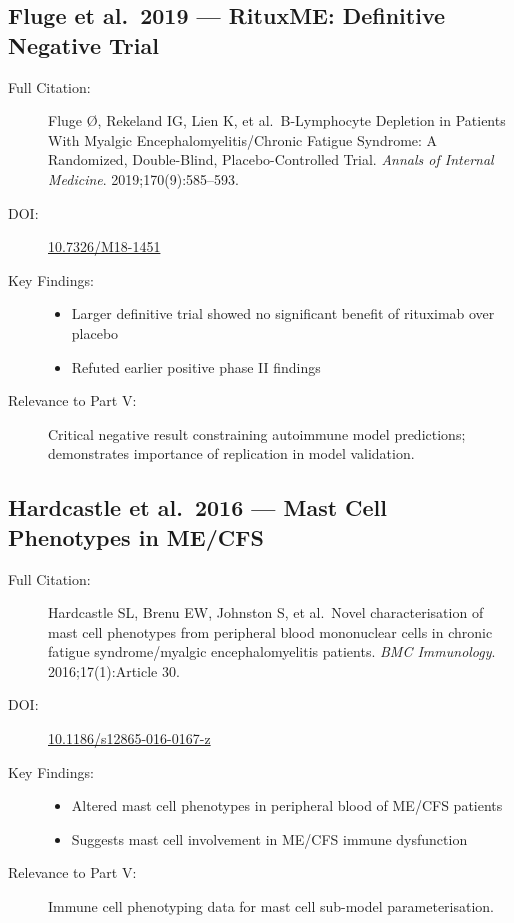 \subsection{Fluge et al.\ 2019 --- RituxME: Definitive Negative Trial}

\begin{description}
    \item[Full Citation:] Fluge {\O}, Rekeland IG, Lien K, et al.\ B-Lymphocyte Depletion in Patients With Myalgic Encephalomyelitis/Chronic Fatigue Syndrome: A Randomized, Double-Blind, Placebo-Controlled Trial. \textit{Annals of Internal Medicine}. 2019;170(9):585--593. \cite{Fluge2019}
    \item[DOI:] \href{https://doi.org/10.7326/M18-1451}{10.7326/M18-1451}
    \item[Key Findings:]
    \begin{itemize}
        \item Larger definitive trial showed no significant benefit of rituximab over placebo
        \item Refuted earlier positive phase II findings
    \end{itemize}
    \item[Relevance to Part V:] Critical negative result constraining autoimmune model predictions; demonstrates importance of replication in model validation.
\end{description}

\subsection{Hardcastle et al.\ 2016 --- Mast Cell Phenotypes in ME/CFS}

\begin{description}
    \item[Full Citation:] Hardcastle SL, Brenu EW, Johnston S, et al.\ Novel characterisation of mast cell phenotypes from peripheral blood mononuclear cells in chronic fatigue syndrome/myalgic encephalomyelitis patients. \textit{BMC Immunology}. 2016;17(1):Article 30. \cite{Hardcastle2016}
    \item[DOI:] \href{https://doi.org/10.1186/s12865-016-0167-z}{10.1186/s12865-016-0167-z}
    \item[Key Findings:]
    \begin{itemize}
        \item Altered mast cell phenotypes in peripheral blood of ME/CFS patients
        \item Suggests mast cell involvement in ME/CFS immune dysfunction
    \end{itemize}
    \item[Relevance to Part V:] Immune cell phenotyping data for mast cell sub-model parameterisation.
\end{description}

